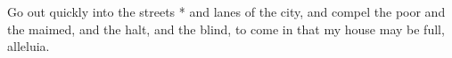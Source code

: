 Go out quickly into the streets * and lanes of the city, and compel the poor and the maimed, and the halt, and the blind, to come in that my house may be full, alleluia.